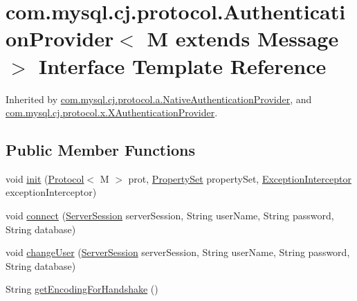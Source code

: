 \hypertarget{interfacecom_1_1mysql_1_1cj_1_1protocol_1_1_authentication_provider}{}\section{com.\+mysql.\+cj.\+protocol.\+Authentication\+Provider$<$ M extends Message $>$ Interface Template Reference}
\label{interfacecom_1_1mysql_1_1cj_1_1protocol_1_1_authentication_provider}


Inherited by \mbox{\hyperlink{classcom_1_1mysql_1_1cj_1_1protocol_1_1a_1_1_native_authentication_provider}{com.\+mysql.\+cj.\+protocol.\+a.\+Native\+Authentication\+Provider}}, and \mbox{\hyperlink{classcom_1_1mysql_1_1cj_1_1protocol_1_1x_1_1_x_authentication_provider}{com.\+mysql.\+cj.\+protocol.\+x.\+X\+Authentication\+Provider}}.

\subsection*{Public Member Functions}
\begin{DoxyCompactItemize}
\item 
void \mbox{\hyperlink{interfacecom_1_1mysql_1_1cj_1_1protocol_1_1_authentication_provider_a8806f98d0408eaad74edc0784fc78825}{init}} (\mbox{\hyperlink{interfacecom_1_1mysql_1_1cj_1_1protocol_1_1_protocol}{Protocol}}$<$ M $>$ prot, \mbox{\hyperlink{interfacecom_1_1mysql_1_1cj_1_1conf_1_1_property_set}{Property\+Set}} property\+Set, \mbox{\hyperlink{interfacecom_1_1mysql_1_1cj_1_1exceptions_1_1_exception_interceptor}{Exception\+Interceptor}} exception\+Interceptor)
\item 
void \mbox{\hyperlink{interfacecom_1_1mysql_1_1cj_1_1protocol_1_1_authentication_provider_a9fa5f015000ed27fdd7e6397317fe423}{connect}} (\mbox{\hyperlink{interfacecom_1_1mysql_1_1cj_1_1protocol_1_1_server_session}{Server\+Session}} server\+Session, String user\+Name, String password, String database)
\item 
void \mbox{\hyperlink{interfacecom_1_1mysql_1_1cj_1_1protocol_1_1_authentication_provider_a166772168a0573ba2f186e49c41b0aec}{change\+User}} (\mbox{\hyperlink{interfacecom_1_1mysql_1_1cj_1_1protocol_1_1_server_session}{Server\+Session}} server\+Session, String user\+Name, String password, String database)
\item 
String \mbox{\hyperlink{interfacecom_1_1mysql_1_1cj_1_1protocol_1_1_authentication_provider_ad030b0dc0784302f1221945aef2ae2e7}{get\+Encoding\+For\+Handshake}} ()
\end{DoxyCompactItemize}
